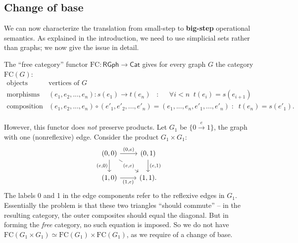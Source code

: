 \documentclass{amsart}
\theoremstyle{definition}
\newcommand{\sSet}{\mathsf{sSet}}
\newcommand{\RGph}{\mathsf{RGph}}
\newcommand{\Cat}{\mathsf{Cat}}
\newcommand{\FC}{\mathrm{FC}}
\newcommand{\maps}{\colon}
\begin{document}

\subsection{Change of base}
We can now characterize the translation from small-step to \textbf{big-step} operational semantics. As explained in the introduction, we need to use simplicial sets rather than graphs; we now give the issue in detail.


The ``free category'' functor $\FC\maps \RGph \to \Cat$ gives for every graph $G$ the category $\FC(G)$: %
\[\begin{array}{rl}
\text{objects} & \text{vertices of } G\\
\text{morphisms} & (e_1,e_2,...,e_n)\maps s(e_1)\to t(e_n) \;\; \; : \;\;\; \;\; \forall i<n \;\; t(e_i)=s(e_{i+1})\\
\text{composition} & (e_1,e_2,...,e_n) \circ (e'_1,e'_2,...,e'_n) = (e_1,...,e_n,e'_1,...,e'_n) \; : \;\; t(e_n)=s(e'_1).\\
  \end{array}\]

However, this functor does \emph{not} preserve products. Let $G_1$ be $\{0\xrightarrow{e} 1\}$, the graph with one (nonreflexive) edge. Consider the product $G_1\times G_1$:
\[\begin{tikzcd}
    (0,0) \arrow[r,"(0{,}e)"] \ar[d,"(e{,}0)",swap] \ar[dr,"(e{,}e)" description] & (0,1) \ar[d,"(e{,}1)"]\\
    (1,0) \ar[r,"(1{,}e)",swap] & (1,1).
  \end{tikzcd}\]
The labels 0 and 1 in the edge components refer to the reflexive edges in $G_1$. Essentially the problem is that these two triangles ``should commute'' -- in the resulting category, the outer composites should equal the diagonal. But in forming the \emph{free} category, no such equation is imposed. So we do not have $\FC(G_1\times G_1) \simeq \FC(G_1)\times \FC(G_1)$, as we require of a change of base.
\end{document}
